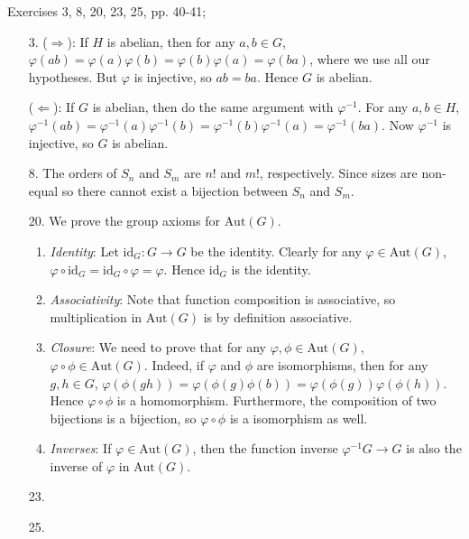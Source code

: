 \documentclass[12pt]{article}
\theoremstyle{remark}
\theoremstyle{named}
\begin{document}
Exercises 3, 8, 20, 23, 25, pp. 40-41;

\begin{enumerate}
    \item [3.] ($\Rightarrow$): If $H$ is abelian, then for any $a, b \in G$, $\varphi(ab) = \varphi(a)\varphi(b) = \varphi(b)\varphi(a) = \varphi(ba)$, where we use all our hypotheses. But $\varphi$ is injective, so $ab = ba$. Hence $G$ is abelian.
    
    ($\Leftarrow$): If $G$ is abelian, then do the same argument with $\varphi^{-1}$. For any $a, b \in H$, $\varphi^{-1}(ab) = \varphi^{-1}(a) \varphi^{-1}(b) = \varphi^{-1}(b)\varphi^{-1}(a) = \varphi^{-1}(ba)$. Now $\varphi^{-1}$ is injective, so $G$ is abelian.
    \item [8.] The orders of $S_n$ and $S_m$ are $n!$ and $m!$, respectively. Since sizes are non-equal so there cannot exist a bijection between $S_n$ and $S_m$.
    
    \item [20.] We prove the group axioms for $\text{Aut}(G)$.
    
    \begin{enumerate}
        \item \textit{Identity}: Let $\text{id}_G : G \to G$ be the identity. Clearly for any $\varphi \in \text{Aut}(G)$, $\varphi \circ \text{id}_G = \text{id}_G \circ \varphi = \varphi$. Hence $\text{id}_G$ is the identity. 
        \item \textit{Associativity}: Note that function composition is associative, so multiplication in $\text{Aut}(G)$ is by definition associative.
        \item \textit{Closure}: We need to prove that for any $\varphi, \phi \in \text{Aut}(G)$, $\varphi \circ \phi \in \text{Aut}(G)$. Indeed, if $\varphi$ and $\phi$ are isomorphisms, then for any $g, h \in G$, $\varphi(\phi(gh)) = \varphi(\phi(g)\phi(b)) = \varphi(\phi(g)) \varphi(\phi(h))$. Hence $\varphi \circ \phi$ is a homomorphism. Furthermore, the composition of two bijections is a bijection, so $\varphi \circ \phi$ is a isomorphism as well.
        \item \textit{Inverses}: If $\varphi \in \text{Aut}(G)$, then the function inverse $\varphi^{-1} G \to G$ is also the inverse of $\varphi$ in $\text{Aut}(G)$.
    \end{enumerate}

    \item [23.] 
    \item [25.] 
\end{enumerate}
\end{document}
